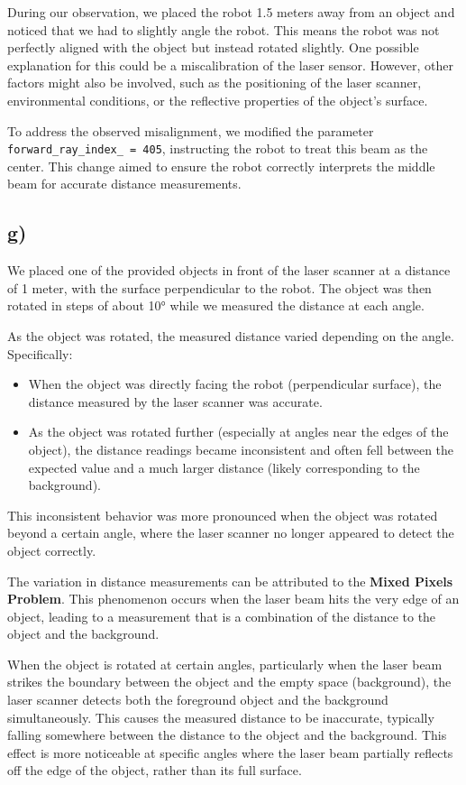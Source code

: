 \documentclass[template,12pt,a4paper,enabledeprecatedfontcommands]{template}
\begin{document}
\noindent
During our observation, we placed the robot 1.5 meters away from an object and noticed that we had to slightly angle the robot. This means the robot was not perfectly aligned with the object but instead rotated slightly. One possible explanation for this could be a miscalibration of the laser sensor. However, other factors might also be involved, such as the positioning of the laser scanner, environmental conditions, or the reflective properties of the object’s surface.

\noindent To address the observed misalignment, we modified the parameter \texttt{forward\_ray\_index\_ = 405}, instructing the robot to treat this beam as the center. This change aimed to ensure the robot correctly interprets the middle beam for accurate distance measurements.


\subsection{g)}

We placed one of the provided objects in front of the laser scanner at a distance of 1 meter, with the surface perpendicular to the robot. The object was then rotated in steps of about 10° while we measured the distance at each angle.


As the object was rotated, the measured distance varied depending on the angle. Specifically:
\begin{itemize}
    \item When the object was directly facing the robot (perpendicular surface), the distance measured by the laser scanner was accurate.
    \item As the object was rotated further (especially at angles near the edges of the object), the distance readings became inconsistent and often fell between the expected value and a much larger distance (likely corresponding to the background).
\end{itemize}

\noindent This inconsistent behavior was more pronounced when the object was rotated beyond a certain angle, where the laser scanner no longer appeared to detect the object correctly.

\noindent The variation in distance measurements can be attributed to the \textbf{Mixed Pixels Problem}. This phenomenon occurs when the laser beam hits the very edge of an object, leading to a measurement that is a combination of the distance to the object and the background.

\noindent When the object is rotated at certain angles, particularly when the laser beam strikes the boundary between the object and the empty space (background), the laser scanner detects both the foreground object and the background simultaneously. This causes the measured distance to be inaccurate, typically falling somewhere between the distance to the object and the background. This effect is more noticeable at specific angles where the laser beam partially reflects off the edge of the object, rather than its full surface.
\end{document}
